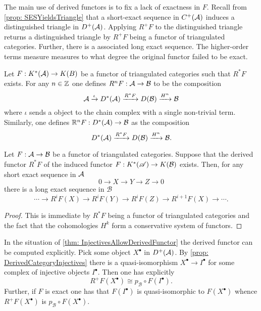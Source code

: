 The main use of derived functors is to fix a lack of exactness in $F$.
Recall from \cref{prop: SESYieldsTriangle} that a short-exact sequence in $C^+(\AA)$ induces a distinguished triangle in $D^+(\AA)$.
Applying $R^+F$ to the distinguished triangle returns a distinguished triangle by $R^+F$ being a functor of triangulated categories.
Further, there is a associated long exact sequence.
The higher-order terms measure measures to what degree the original functor failed to be exact.
\begin{definition}
 Let $F:K^*(\AA) \to K(B)$ be a functor of triangulated categories such that $R^*F$ exists.
 For any $n\in \Z$ one defines $R^nF:\AA \to \mathcal{B}$ to be the composition
 $$\AA\xrightarrow{\iota} D^*(\AA) \xrightarrow{R^*F} D(\mathcal{B}) \xrightarrow{H^n} \mathcal{B} $$
 where $\iota$ sends a object to the chain complex with a single non-trivial term.
 Similarly, one defines $\mathbb{R}^nF:D^*(\AA)\to \mathcal{B}$ as the composition
 $$D^*(\AA) \xrightarrow{R^*F} D(\mathcal{B}) \xrightarrow{H^n} \mathcal{B}. $$
\end{definition}
\begin{proposition}
   Let $F:\AA\to \mathcal{B}$ be a functor of triangulated categories.
   Suppose that the derived functor $R^*F$ of the induced functor $F:K^*(\A)\to K(\mathcal{B})$ exists.
   Then, for any short exact sequence in $\AA$
   $$0\to X \to Y \to Z \to 0 $$
   there is a long exact sequence in $\mathcal{B}$
   $$ \cdots \to R^{i}F(X)\to R^{i}F(Y) \to R^iF(Z) \to R^{i+1}F(X)\to \cdots. $$
\end{proposition}
\begin{proof}
  This is immediate by $R^*F$ being a functor of triangulated categories and the fact that the cohomologies $H^k$ form a conservative system of functors.
\end{proof}
In the situation of \cref{thm: InjectivesAllowDerivedFunctor} the derived functor can be computed explicitly.
Pick some object $X^\bullet$ in $D^+(\AA)$.
By \cref{prop: DerivedCategoryInjectives} there is a quasi-isomorphism $X^\bullet\to I^\bullet$ for some complex of injective objects $I^\bullet$.
Then one has explicitly
$$R^+F(X^\bullet) \cong p_\mathcal{B} \circ F(I^\bullet). $$
Further, if $F$ is exact one has that $F(I^\bullet)$ is quasi-isomorphic to $F(X^\bullet)$ whence $R^+F(X^\bullet)$ is $p_\mathcal{B}\circ F(X^\bullet)$.

